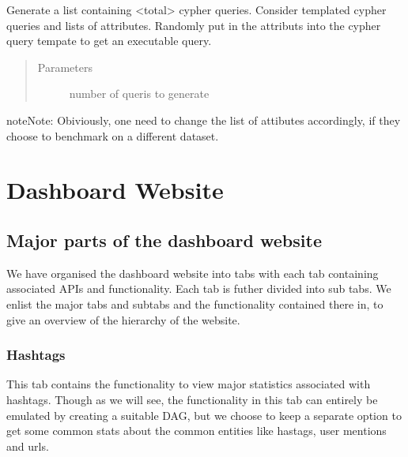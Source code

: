 \documentclass[letterpaper,10pt,english]{sphinxmanual}
\begin{document}

\begin{fulllineitems}
\label{\detokenize{benchmarking:query_answering.generate_random_queries}}
Generate a list containing \textless{}total\textgreater{} cypher queries. Consider templated cypher queries and lists of attributes. Randomly put in the attributs into the cypher
query tempate to get an executable query.
\begin{quote}\begin{description}
\item[{Parameters}] \leavevmode
{} \textendash{} number of queris to generate

\end{description}\end{quote}

\begin{sphinxadmonition}{note}{Note:}
Obiviously, one need to change the list of attibutes accordingly, if they choose to benchmark on a different dataset.
\end{sphinxadmonition}

\end{fulllineitems}



\chapter{Dashboard Website}
\label{\detokenize{dashboard_website:dashboard-website}}\label{\detokenize{dashboard_website::doc}}

\section{Major parts of the dashboard website}
\label{\detokenize{dashboard_website:major-parts-of-the-dashboard-website}}
We have organised the dashboard website into tabs with each tab containing associated APIs and functionality. Each tab is futher divided into sub tabs. We enlist the major tabs and subtabs and the functionality contained there in, to give an overview of the hierarchy of the website.


\subsection{Hashtags}
\label{\detokenize{dashboard_website:hashtags}}
This tab contains the functionality to view major statistics associated with hashtags. Though as we will see, the functionality in this tab can entirely be emulated by creating a suitable DAG, but we choose to keep a separate option to get some common stats about the common entities like hastags, user mentions and urls.
\end{document}
